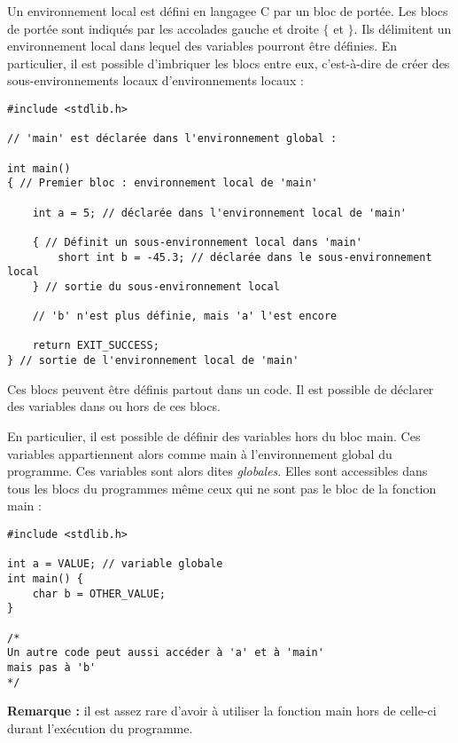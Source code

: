 \documentclass[../../../main.tex]{subfiles}
\begin{document}

Un environnement local est défini en langagee C par un bloc de portée. Les blocs de portée sont indiqués par les accolades gauche et droite $\{$ et $\}$. Ils délimitent un environnement local dans lequel des variables pourront être définies. En particulier, il est possible d'imbriquer les blocs entre eux, c'est-à-dire de créer des sous-environnements locaux d'environnements locaux :

\begin{verbatim}
#include <stdlib.h>

// 'main' est déclarée dans l'environnement global :

int main()
{ // Premier bloc : environnement local de 'main'

	int a = 5; // déclarée dans l'environnement local de 'main'

	{ // Définit un sous-environnement local dans 'main'
		short int b = -45.3; // déclarée dans le sous-environnement local
	} // sortie du sous-environnement local

	// 'b' n'est plus définie, mais 'a' l'est encore
	
	return EXIT_SUCCESS;
} // sortie de l'environnement local de 'main'

\end{verbatim}

Ces blocs peuvent être définis partout dans un code. Il est possible de déclarer des variables dans ou hors de ces blocs.
 
En particulier, il est possible de définir des variables hors du bloc \textsf{main}. Ces variables appartiennent alors comme \textsf{main} à l'environnement global du programme. Ces variables sont alors dites \textit{globales}. Elles sont accessibles dans tous les blocs du programmes même ceux qui ne sont pas le bloc de la fonction \textsf{main} :
\begin{verbatim}
#include <stdlib.h>

int a = VALUE; // variable globale
int main() {
	char b = OTHER_VALUE;
}

/*
Un autre code peut aussi accéder à 'a' et à 'main'
mais pas à 'b'
*/
\end{verbatim}
\textbf{Remarque :} il est assez rare d'avoir à utiliser la fonction \textsf{main} hors de celle-ci durant l'exécution du programme.
\end{document}
